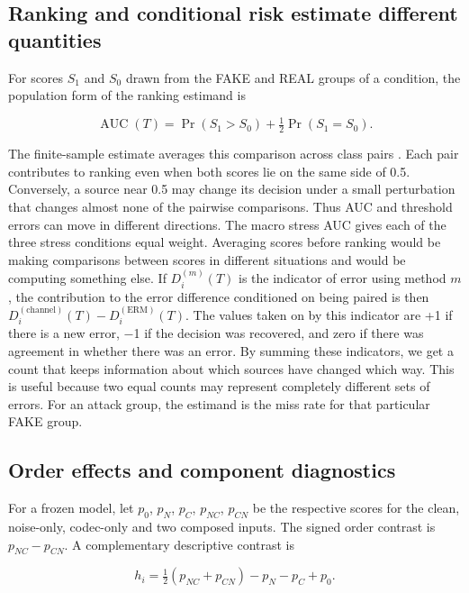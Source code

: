 \subsection{Ranking and conditional risk estimate different quantities}

For scores \(S_1\) and \(S_0\) drawn from the FAKE and REAL groups of a condition, the population form of the ranking estimand is

\begin{equation}
 \operatorname{AUC}(T)=\Pr(S_1>S_0)+\tfrac{1}{2}\Pr(S_1=S_0).
 \label{eq:auc}
\end{equation}

The finite-sample estimate averages this comparison across class pairs \cite{hanley}. Each pair contributes to ranking even when both scores lie on the same side of 0.5. Conversely, a source near 0.5 may change its decision under a small perturbation that changes almost none of the pairwise comparisons. Thus AUC and threshold errors can move in different directions. The macro stress AUC gives each of the three stress conditions equal weight. Averaging scores before ranking would be making comparisons between scores in different situations and would be computing something else. If \(D_i^{(m)}(T)\) is the indicator of error using method \(m\), the contribution to the error difference conditioned on being paired is then \(D_i^{(\mathrm{channel})}(T)-D_i^{(\mathrm{ERM})}(T)\). The values taken on by this indicator are +1 if there is a new error, \ensuremath{-}1 if the decision was recovered, and zero if there was agreement in whether there was an error. By summing these indicators, we get a count that keeps information about which sources have changed which way. This is useful because two equal counts may represent completely different sets of errors. For an attack group, the estimand is the miss rate for that particular FAKE group.

\subsection{Order effects and component diagnostics}

For a frozen model, let \(p_0\), \(p_N\), \(p_C\), \(p_{NC}\), \(p_{CN}\) be the respective scores for the clean, noise-only, codec-only and two composed inputs. The signed order contrast is \(p_{NC}-p_{CN}\). A complementary descriptive contrast is

\begin{equation}
 h_i=\tfrac{1}{2}(p_{NC}+p_{CN})-p_N-p_C+p_0 .
 \label{eq:composition}
\end{equation}


